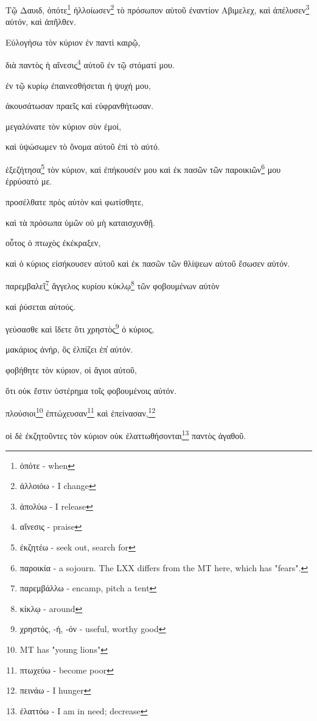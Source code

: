 \pagebreak



Τῷ
Δαυιδ,
ὁπότε\footnote{ὁπότε - when}
ἠλλοίωσεν\footnote{ἀλλοιόω - I change}
τὸ
πρόσωπον
αὐτοῦ
ἐναντίον
Αβιμελεχ,
καὶ
ἀπέλυσεν\footnote{ἀπολύω - I release}
αὐτόν,
καὶ
ἀπῆλθεν.

Εὐλογήσω
τὸν
κύριον
ἐν
παντὶ
καιρῷ,

διὰ
παντὸς
ἡ
αἴνεσις\footnote{αἴνεσις - praise}
αὐτοῦ
ἐν
τῷ
στόματί
μου.

ἐν
τῷ
κυρίῳ
ἐπαινεσθήσεται
ἡ
ψυχή
μου,

ἀκουσάτωσαν
πραεῖς
καὶ
εὐφρανθήτωσαν.

μεγαλύνατε
τὸν
κύριον
σὺν
ἐμοί,

καὶ
ὑψώσωμεν
τὸ
ὄνομα
αὐτοῦ
ἐπὶ
τὸ
αὐτό.

ἐξεζήτησα\footnote{ἐκζητέω - seek out, search for}
τὸν
κύριον,
καὶ
ἐπήκουσέν
μου
καὶ
ἐκ
πασῶν
τῶν
παροικιῶν\footnote{παροικία - a sojourn. The LXX differs from the MT here, which has "fears".}
μου
ἐρρύσατό
με.

προσέλθατε
πρὸς
αὐτὸν
καὶ
φωτίσθητε,

καὶ
τὰ
πρόσωπα
ὑμῶν
οὐ
μὴ
καταισχυνθῇ.

οὗτος
ὁ
πτωχὸς
ἐκέκραξεν,

καὶ
ὁ
κύριος
εἰσήκουσεν
αὐτοῦ
καὶ
ἐκ
πασῶν
τῶν
θλίψεων
αὐτοῦ
ἔσωσεν
αὐτόν.

παρεμβαλεῖ\footnote{παρεμβάλλω - encamp, pitch a tent}
ἄγγελος
κυρίου
κύκλῳ\footnote{κίκλῳ - around}
τῶν
φοβουμένων
αὐτὸν

καὶ
ῥύσεται
αὐτούς.

γεύσασθε
καὶ
ἴδετε
ὅτι
χρηστὸς\footnote{χρηστός, -ή, -όν - useful, worthy good}
ὁ
κύριος,

μακάριος
ἀνήρ,
ὃς
ἐλπίζει
ἐπ̓
αὐτόν.

φοβήθητε
τὸν
κύριον,
οἱ
ἅγιοι
αὐτοῦ,

ὅτι
οὐκ
ἔστιν
ὑστέρημα
τοῖς
φοβουμένοις
αὐτόν.

πλούσιοι\footnote{MT has "young lions"}
ἐπτώχευσαν\footnote{πτωχεύω - become poor}
καὶ
ἐπείνασαν,\footnote{πεινάω - I hunger}

οἱ
δὲ
ἐκζητοῦντες
τὸν
κύριον
οὐκ
ἐλαττωθήσονται\footnote{ἐλαττόω - I am in need; decrease}
παντὸς
ἀγαθοῦ.

